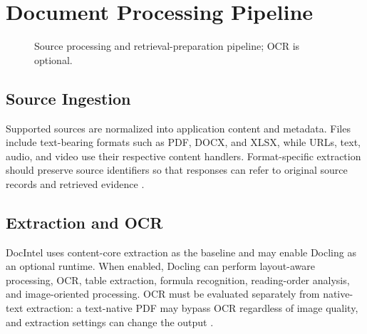 \documentclass[conference]{IEEEtran}
\begin{document}
\section{Document Processing Pipeline}
\begin{figure}[!t]
\centering
{}
\caption{Source processing and retrieval-preparation pipeline; OCR is optional.}
\label{fig:pipeline}
\end{figure}


\subsection{Source Ingestion}
Supported sources are normalized into application content and metadata. Files include text-bearing formats such as PDF, DOCX, and XLSX, while URLs, text, audio, and video use their respective content handlers. Format-specific extraction should preserve source identifiers so that responses can refer to original source records and retrieved evidence \cite{docintel}.

\subsection{Extraction and OCR}
DocIntel uses content-core extraction as the baseline and may enable Docling as an optional runtime. When enabled, Docling can perform layout-aware processing, OCR, table extraction, formula recognition, reading-order analysis, and image-oriented processing. OCR must be evaluated separately from native-text extraction: a text-native PDF may bypass OCR regardless of image quality, and extraction settings can change the output \cite{docling2024,doclingDocs2026}.
\end{document}
